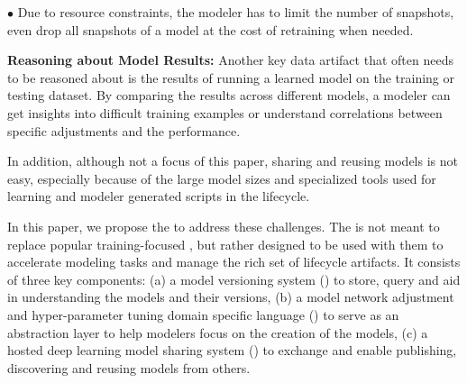 \documentclass[conference]{IEEEtran}
\begin{document}
\begin{list}{$\bullet$}{\leftmargin 0.10in \topsep -2pt}
       Due to resource constraints, the modeler has to limit the number of snapshots, even drop all snapshots of a model at the cost of retraining when needed. 
      \item \textbf{Reasoning about Model Results:} Another key data artifact that often needs to be reasoned about is the results of running a learned model on the training or testing dataset. By comparing the results across different models, a modeler can get insights into difficult training examples or understand correlations between specific adjustments and the performance.
\end{list}
In addition, although not a focus of this paper, sharing and reusing models is not easy, especially because of the large model sizes and specialized tools used for learning and modeler generated scripts in the lifecycle.


In this paper, we propose the \modelhub\system to address these challenges. 
The \modelhub\system is not meant to replace popular training-focused \dnn\systems, but rather designed to be used with them to accelerate modeling tasks and manage the rich set of lifecycle artifacts.
It consists of three key components: (a) a model versioning system (\DLV) to store, query and aid in understanding the models and their versions, (b) a model network adjustment and hyper-parameter tuning domain specific language (\DQL) to serve as an abstraction layer to help modelers focus on the creation of the models, (c) a hosted deep learning model sharing system (\modelhub) to exchange \DLV\repositories and enable publishing, discovering and reusing models from others. 
\end{document}
